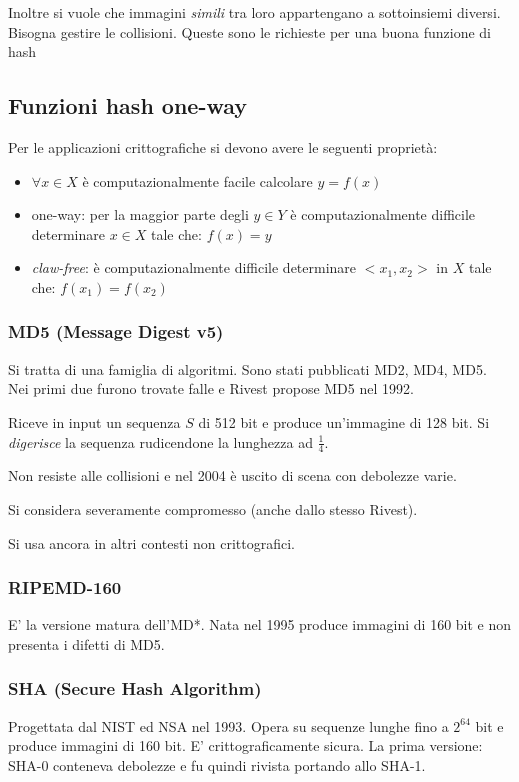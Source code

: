 Inoltre si vuole che immagini \emph{simili} tra loro appartengano a sottoinsiemi diversi.
Bisogna gestire le collisioni.
Queste sono le richieste per una buona funzione di hash

\subsection{Funzioni hash one-way}
Per le applicazioni crittografiche si devono avere le seguenti proprietà:
\begin{itemize}
    \item $\forall x \in X$ è computazionalmente facile calcolare $y = f(x)$
    \item one-way: per la maggior parte degli $y \in Y$ è computazionalmente difficile determinare $x \in X$ tale che: $f(x) = y$
    \item \emph{claw-free}: è computazionalmente difficile determinare $<x_1, x_2>$ in $X$ tale che: $f(x_1)=f(x_2)$ 
\end{itemize}

\subsubsection{MD5 (Message Digest v5)}
Si tratta di una famiglia di algoritmi.
Sono stati pubblicati MD2, MD4, MD5.
Nei primi due furono trovate falle e Rivest propose MD5 nel 1992.

Riceve in input un sequenza $S$ di 512 bit e produce un'immagine di 128 bit.
Si \emph{digerisce} la sequenza rudicendone la lunghezza ad $\frac{1}{4}$.

Non resiste alle collisioni e nel 2004 è uscito di scena con debolezze varie.

Si considera severamente compromesso (anche dallo stesso Rivest).

Si usa ancora in altri contesti non crittografici.

\subsubsection{RIPEMD-160}
E' la versione matura dell'MD*. Nata nel 1995 produce immagini di 160 bit e non presenta i difetti di MD5.

\subsubsection{SHA (Secure Hash Algorithm)}
Progettata dal NIST ed NSA nel 1993.
Opera su sequenze lunghe fino a $2^{64}$ bit e produce immagini di 160 bit.
E' crittograficamente sicura.
La prima versione: SHA-0 conteneva debolezze e fu quindi rivista portando allo SHA-1.

